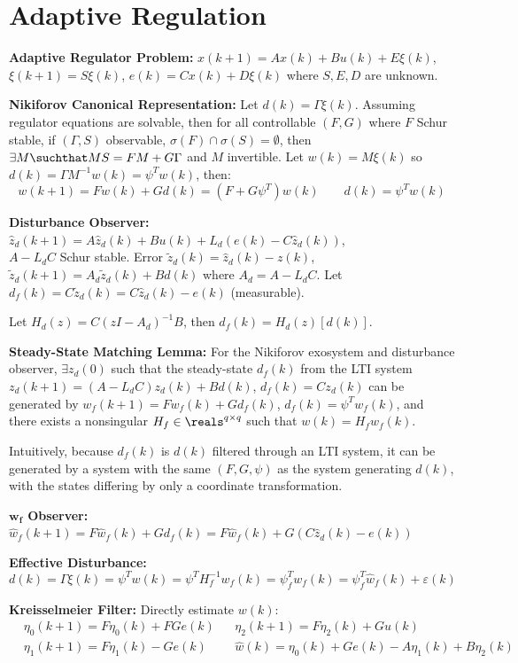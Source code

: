 \documentclass[twocolumn, 8pt]{extarticle}
\begin{document}
\section{Adaptive Regulation} %

\textbf{Adaptive Regulator Problem:} \(x(k + 1) = Ax(k) + Bu(k) + E\xi(k)\), \(\xi(k + 1) = S\xi(k)\), \(e(k) = Cx(k) +
D\xi(k)\) where \(S, E, D\) are unknown.

\textbf{Nikiforov Canonical Representation:} Let \(d(k) = \Gamma\xi(k)\). Assuming regulator equations are solvable,
then for all controllable \((F, G)\) where \(F\) Schur stable, if \((\Gamma, S)\) observable, \(\sigma(F) \cap \sigma(S)
= \emptyset\), then \(\exists M \suchthat MS = FM + G\Gamma\) and \(M\) invertible. Let \(w(k) = M\xi(k)\) so \(d(k) =
\Gamma M^{-1}w(k) = \psi^Tw(k)\), then:
\[w(k + 1) = Fw(k) + Gd(k) = (F + G\psi^T)w(k) \qquad d(k) = \psi^Tw(k)\]

\textbf{Disturbance Observer:} $\hat z_d(k + 1) = A\hat z_d(k) + Bu(k) + L_d(e(k) - C\hat z_d(k))$, \\
$A - L_dC$ Schur stable. Error $\tilde z_d(k) = \hat z_d(k) - z(k)$, $\tilde z_d(k + 1) = A_d\tilde z_d(k) + Bd(k)$
where \(A_d = A - L_dC\). Let $d_f(k) = C\tilde z_d(k) = C\hat z_d(k) - e(k)$ (measurable).

Let \(H_d(z) = C(zI - A_d)^{-1}B\), then \(d_f(k) = H_d(z)\left[d(k)\right]\).

\textbf{Steady-State Matching Lemma:} For the Nikiforov exosystem and disturbance observer, \(\exists z_d(0)\) such
that the steady-state \(d_f(k)\) from the LTI system \(z_d(k + 1) = (A - L_dC)z_d(k) + Bd(k)\), \(d_f(k) = Cz_d(k)\) can
be generated by \(w_f(k + 1) = Fw_f(k) + Gd_f(k)\), \(d_f(k) = \psi^Tw_f(k)\), and there exists a nonsingular $H_f \in
\reals^{q \times q}$ such that $w(k) = H_fw_f(k)$.

Intuitively, because \(d_f(k)\) is \(d(k)\) filtered through an LTI system, it can be generated by a system with the
same \((F, G, \psi)\) as the system generating \(d(k)\), with the states differing by only a coordinate transformation.

\textbf{\(\bm w_{\bm f}\) Observer:} \(\hat w_f(k + 1) = F\hat w_f(k) + Gd_f(k) = F\hat w_f(k) + G(C\hat z_d(k) - e(k))\)

\textbf{Effective Disturbance:}
\[d(k) = \Gamma\xi(k) = \psi^Tw(k) = \psi^TH_f^{-1}w_f(k) = \psi _f^Tw_f(k) = \psi _f^T\hat w_f(k) + \varepsilon(k)\]

\textbf{Kreisselmeier Filter:} Directly estimate \(w(k)\):
\begin{align*}
    &\eta _0(k + 1) = F\eta _0(k) + FGe(k) && \eta _2(k + 1) = F\eta _2(k) + Gu(k) \\
    &\eta _1(k + 1) = F\eta _1(k) - Ge(k)  && \hat w(k) = \eta _0(k) + Ge(k) - A\eta _1(k) + B\eta _2(k)
\end{align*}
\end{document}
